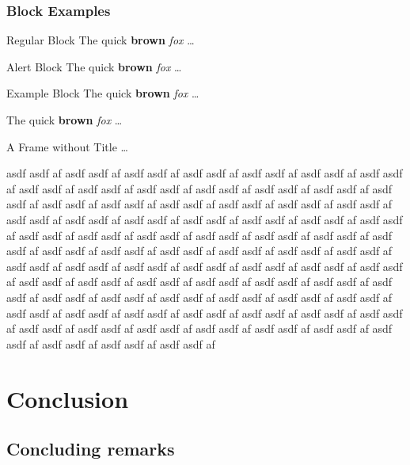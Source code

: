 \documentclass[inverse,aspectratio=169,classification=confidential]{lh-presentation}
\begin{document}
\begin{frame}
\frametitle{Block Examples}
\begin{block}{Regular Block}
The \alert{quick} \textbf{brown} \emph{fox} \ldots
\end{block}
\begin{alertblock}{Alert Block}
The \alert{quick} \textbf{brown} \emph{fox} \ldots
\end{alertblock}
\begin{exampleblock}{Example Block}
The \alert{quick} \textbf{brown} \emph{fox} \ldots
\end{exampleblock}
\begin{quotebox}
The \alert{quick} \textbf{brown} \emph{fox} \ldots
\end{quotebox}

\end{frame}

\begin{frame}
A Frame without Title \ldots

asdf asdf af 
asdf asdf af 
asdf asdf af 
asdf asdf af 
asdf asdf af 
asdf asdf af 
asdf asdf af 
asdf asdf af 
asdf asdf af 
asdf asdf af 
asdf asdf af 
asdf asdf af 
asdf asdf af 
asdf asdf af 
asdf asdf af 
asdf asdf af 
asdf asdf af 
asdf asdf af 
asdf asdf af 
asdf asdf af 
asdf asdf af 
asdf asdf af 
asdf asdf af 
asdf asdf af 
asdf asdf af 
asdf asdf af 
asdf asdf af 
asdf asdf af 
asdf asdf af 
asdf asdf af 
asdf asdf af 
asdf asdf af 
asdf asdf af 
asdf asdf af 
asdf asdf af 
asdf asdf af 
asdf asdf af 
asdf asdf af 
asdf asdf af 
asdf asdf af 
asdf asdf af 
asdf asdf af 
asdf asdf af 
asdf asdf af 
asdf asdf af 
asdf asdf af 
asdf asdf af 
asdf asdf af 
asdf asdf af 
asdf asdf af 
asdf asdf af 
asdf asdf af 
asdf asdf af 
asdf asdf af 
asdf asdf af 
asdf asdf af 
asdf asdf af 
asdf asdf af 
asdf asdf af 
asdf asdf af 
asdf asdf af 
asdf asdf af 
asdf asdf af 
asdf asdf af 
asdf asdf af 
asdf asdf af 
asdf asdf af 
asdf asdf af 
asdf asdf af 
asdf asdf af 
asdf asdf af 
asdf asdf af 
asdf asdf af 
asdf asdf af 
asdf asdf af 
asdf asdf af 
asdf asdf af 
\end{frame}

\section{Conclusion}
\subsection{Concluding remarks}
\end{document}

